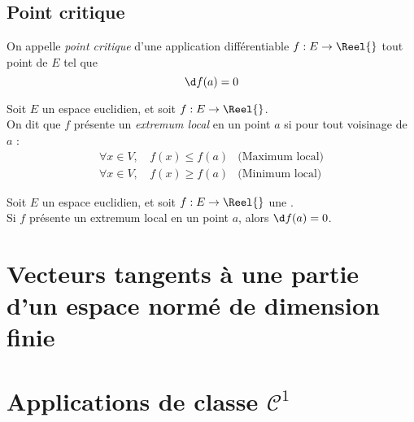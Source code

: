 \documentclass[11pt,a4paper,fleqn,pdftex]{report}
\begin{document}
\subsection{Point critique} %
\label{sub:point_critique}
\begin{dfn}
     On appelle \emph{point critique} d'une application différentiable $f : E \to \Reel{}$ tout point de $E$ tel que 
     \begin{equation}
     \d f(a) = 0
     \end{equation}
\end{dfn}
\begin{dfn}
     Soit $E$ un espace euclidien, et soit $f : E \to \Reel{}$. \\
     On dit que $f$ présente un \emph{extremum local} en un point $a$ si pour tout voisinage de $a$ : 
     \begin{subequations}
          \begin{align}
               \forall x\in V,\, & f(x) \le f(a) & \text{(Maximum local)}\\
               \forall x\in V,\, & f(x) \ge f(a) & \text{(Minimum local)}
          \end{align}
     \end{subequations}
\end{dfn}
\begin{itheorem}
     Soit $E$ un espace euclidien, et soit $f : E \to \Reel{}$ une . \\
     Si $f$ présente un extremum local en un point $a$, alors $\d f(a) = 0$.
\end{itheorem}
\section{Vecteurs tangents à une partie d'un espace normé de dimension finie} %
\label{sec:vecteurs_tangents_une_partie_d_un_espace_norme_de_dimension_finie}

\section{Applications de classe $\mathcal{C}^1$} %
\label{sec:applications_de_classe_C1}
\end{document}
